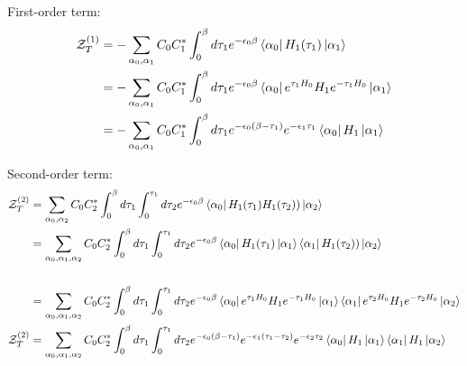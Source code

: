 \documentclass[12pt, two sided]{article}
\begin{document}
First-order term:
\begin{equation}
\begin{aligned}
\mathcal{Z}_T^{(1)} &= -\sum_{\alpha_0, \alpha_1} C_0 C_1^{*}  \int_{0}^{\beta} d\tau_1 e^{-\epsilon_0 \beta} \bra{\alpha_0}  H_1(\tau_1) \ket{\alpha_1} \\
&= -\sum_{\alpha_0, \alpha_1} C_0 C_1^{*}  \int_{0}^{\beta} d\tau_1 e^{-\epsilon_0 \beta} \bra{\alpha_0} e^{\tau_1 H_0}H_1e^{-\tau_1 H_0}  \ket{\alpha_1} \\
&= -\sum_{\alpha_0, \alpha_1} C_0 C_1^{*}  \int_{0}^{\beta} d\tau_1 e^{-\epsilon_0(\beta-\tau_1)} e^{-\epsilon_1 \tau_1}  \bra{\alpha_0} H_1 \ket{\alpha_1}
\end{aligned}
\end{equation}


Second-order term:
\begin{equation}
\begin{aligned}
\mathcal{Z}_T^{(2)} &=  \sum_{\alpha_0, \alpha_2} C_0 C_2^{*} \int_0^{\beta} d\tau_1 \int_{0}^{\tau_1} d\tau_2 e^{-\epsilon_{0} \beta} \bra{\alpha_0}  H_1(\tau_1) H_1(\tau_2) ) \ket{\alpha_2} \\
&= \sum_{\alpha_0, \alpha_1, \alpha_2} C_0 C_2^{*} \int_0^{\beta} d\tau_1 \int_{0}^{\tau_1} d\tau_2 e^{-\epsilon_{0} \beta} \bra{\alpha_0}  H_1(\tau_1) \ket{\alpha_1} \bra{\alpha_1}   H_1(\tau_2) )  \ket{\alpha_2} \\
\\
&= \sum_{\alpha_0, \alpha_1, \alpha_2} C_0 C_2^{*} \int_0^{\beta} d\tau_1 \int_{0}^{\tau_1} d\tau_2 e^{-\epsilon_{0} \beta} \bra{\alpha_0}  e^{\tau_1 H_0}H_1e^{-\tau_1 H_0}  \ket{\alpha_1} \bra{\alpha_1} e^{\tau_2 H_0}H_1e^{-\tau_2 H_0}  \ket{\alpha_2} \\
\mathcal{Z}_T^{(2)} &= \sum_{\alpha_0, \alpha_1, \alpha_2} C_0 C_2^{*} \int_0^{\beta} d\tau_1 \int_{0}^{\tau_1} d\tau_2 e^{-\epsilon_0(\beta-\tau_1)} e^{-\epsilon_1(\tau_1-\tau_2)} e^{-\epsilon_2 \tau_2} \bra{\alpha_0} H_1 \ket{\alpha_1} \bra{\alpha_1} H_1 \ket{\alpha_2}
\end{aligned}
\end{equation}
\end{document}

